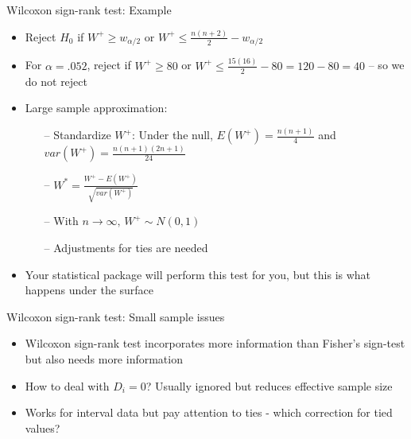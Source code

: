 \documentclass[xcolor=table,dvipsnames]{beamer}
\begin{document}
\begin{frame}{Wilcoxon sign-rank test: Example}
\begin{itemize}
\item Reject $H_0$ if $W^+\geq w_{\alpha/2}$ or $W^+\leq\frac{n(n+2)}{2}-w_{\alpha/2}$ \pause
\item For $\alpha=.052$, reject if $W^+ \geq 80$ or $W^+\leq\frac{15(16)}{2} - 80 = 120 - 80 = 40$ \pause -- so we do not reject \pause
\item Large sample approximation: \pause
	\begin{itemize}
	\item[--] Standardize $W^+$: Under the null, $E(W^+)=\frac{n(n+1)}{4}$ and $var(W^+)=\frac{n(n+1)(2n+1)}{24}$ \pause
	\item[--] $W^* = \frac{W^+ - E(W^+)}{\sqrt{var(W^+)}}$ \pause
	\item[--] With $n\rightarrow\infty,\,W^+\sim N(0,1)$ \pause
	\item[--] Adjustments for ties are needed
	\end{itemize}
\item Your statistical package will perform this test for you, but this is what happens under the surface
\end{itemize}
\end{frame}

\begin{frame}{Wilcoxon sign-rank test: Small sample issues}
\begin{itemize}
\item Wilcoxon sign-rank test incorporates more information than Fisher's sign-test but also needs more information \pause
\item How to deal with $D_i=0$? Usually ignored but reduces effective sample size \pause
\item Works for interval data but pay attention to ties - which correction for tied values?
\end{itemize}
\end{frame}

\end{document}
